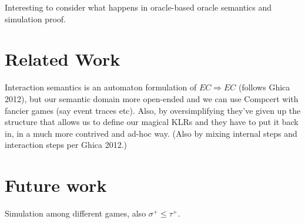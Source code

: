 \documentclass[acmsmall,anonymous]{acmart}
\begin{document}
Interesting to consider what happens in
oracle-based oracle semantics and simulation proof.


\section{Related Work} %

Interaction semantics is an automaton formulation of $EC \Rightarrow EC$
(follows Ghica 2012),
but our semantic domain more open-ended and
we can use Compcert with fancier games
(say event traces etc).
Also,
by oversimplifying they've given up the structure
that allows us to define our magical KLRs
and they have to put it back in,
in a much more contrived and ad-hoc way.
(Also by mixing internal steps and interaction steps per Ghica 2012.)


\section{Future work} %

Simulation among different games,
also $\sigma^+ \le \tau^+$.



\end{document}

